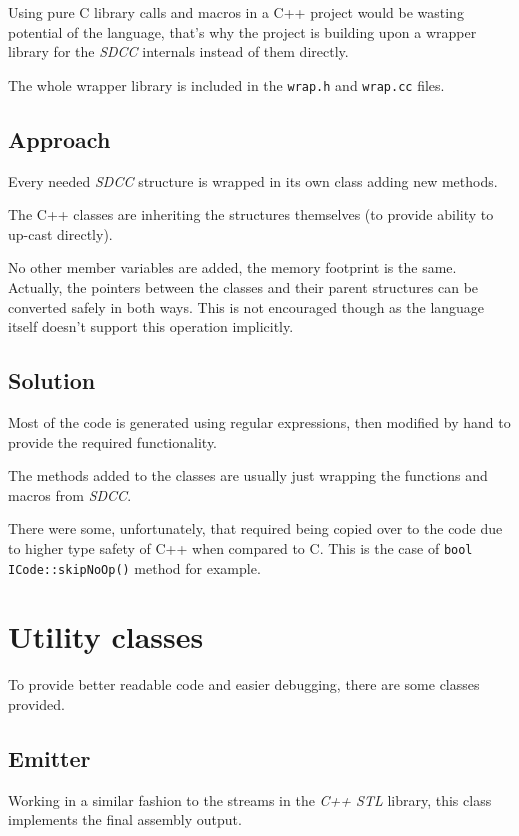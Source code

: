 Using pure C library calls and macros in a C++ project would be wasting potential of the language, that's why the project is building upon a wrapper library for the \emph{SDCC} internals instead of them directly.

The whole wrapper library is included in the \texttt{wrap.h} and \texttt{wrap.cc} files.

    \subsection{Approach}

    Every needed \emph{SDCC} structure is wrapped in its own class adding new methods.

    The C++ classes are inheriting the structures themselves (to provide ability to up-cast directly).

    No other member variables are added, the memory footprint is the same. Actually, the pointers between the classes and their parent structures can be converted safely in both ways. This is not encouraged though as the language itself doesn't support this operation implicitly.

    \subsection{Solution}

    Most of the code is generated using regular expressions, then modified by hand to provide the required functionality.

    The methods added to the classes are usually just wrapping the functions and macros from \emph{SDCC}.

    There were some, unfortunately, that required being copied over to the code due to higher type safety of C++ when compared to C. This is the case of \texttt{bool ICode::skipNoOp()} method for example.

\section{Utility classes}

To provide better readable code and easier debugging, there are some classes provided.

    \subsection{Emitter}\label{emitter}

    Working in a similar fashion to the streams in the \emph{C++ STL} library, this class implements the final assembly output.

